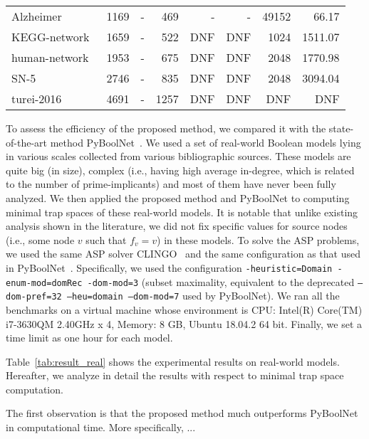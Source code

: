 \documentclass[runningheads]{llncs}
\newcommand{\vangiang}[1]{\textcolor{magenta}{#1}}
\begin{document}
\begin{table}[!htb]
\begin{tabular}{lrrrrrrr}
    Alzheimer~\cite{aghamiri2020automated} & 1169 & - & 469 & - & - & 49152 & 66.17 \\
    KEGG-network~\cite{DBLP:journals/bmcsb/Kwon16} & 1659 & - & 522 & DNF & DNF & 1024 & 1511.07 \\
    human-network~\cite{kim2011reduction} & 1953 & - & 675 & DNF & DNF & 2048 & 1770.98 \\ \midrule
    
    SN-5~\cite{kim2013rmod} & 2746 & - & 835 & DNF & DNF & 2048 & 3094.04 \\
    turei-2016~\cite{lee2019signal} & 4691 & - & 1257 & DNF & DNF & DNF & DNF \\
    
    \bottomrule
  \end{tabular}

\end{table}

To assess the efficiency of the proposed method, we compared it with the state-of-the-art method PyBoolNet~\cite{klarner2017pyboolnet}.
We used a set of real-world Boolean models lying in various scales collected from various bibliographic sources.
These models are quite big (in size), complex (i.e., having high average in-degree, which is related to the number of prime-implicants) and most of them have never been fully analyzed.
We then applied the proposed method and PyBoolNet to computing minimal trap spaces of these real-world models.
It is notable that unlike existing analysis shown in the literature, we did not fix specific values for source nodes (i.e., some node \(v\) such that \(f_v = v\)) in these models.
To solve the ASP problems, we used the same ASP solver CLINGO~\cite{DBLP:journals/aicom/GebserKKOSS11} and the same configuration as that used in PyBoolNet~\cite{klarner2015computing}.
Specifically, we used the configuration \texttt{-heuristic=Domain -enum-mod=domRec -dom-mod=3} (subset maximality, equivalent to the deprecated \texttt{--dom-pref=32 --heu=domain --dom-mod=7} used by PyBoolNet). We ran all the benchmarks on a virtual machine whose environment is CPU: Intel(R) Core(TM) i7-3630QM 2.40GHz x 4, Memory: 8 GB, Ubuntu 18.04.2 64 bit. Finally, we set a time limit as one hour for each model.

Table~\ref{tab:result_real} shows the experimental results on real-world models. Hereafter, we analyze in detail the results with respect to minimal trap space computation.

The first observation is that the proposed method much outperforms PyBoolNet in computational time. More specifically, ...
\end{document}
